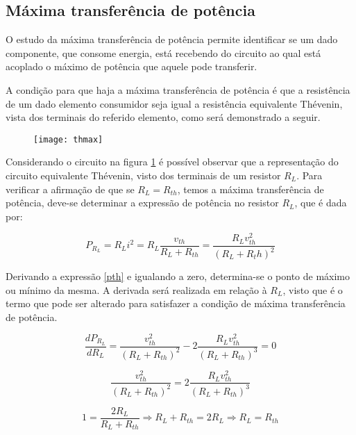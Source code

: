 \documentclass[12pt,fleqn]{book} %
\begin{document}
    \subsection{Máxima transferência de potência}{

O estudo da máxima transferência de potência permite identificar se um dado componente, que consome energia, está recebendo do circuito ao qual está acoplado o máximo de potência que aquele pode transferir.

A condição para que haja a máxima transferência de potência é que a resistência de um dado elemento consumidor seja igual a resistência equivalente Thévenin, vista dos terminais do referido elemento, como será demonstrado a seguir.

\begin{figure}[!htbp] \centering\texttt{[image: thmax]}
            \caption{}\label{thmax} 
        \end{figure}

Considerando o circuito na figura \ref{thmax} é possível observar que a representação do circuito equivalente Thévenin, visto dos terminais de um resistor $R_L$. Para verificar a afirmação de que se $R_L=R_{th}$, temos a máxima transferência de potência, deve-se determinar a expressão de potência no resistor $R_L$, que é dada por:

\begin{equation}\label{pth}
P_{R_L} = R_L i^2 = R_L \frac{v_{th}}{R_L+R_{th}} = \frac{R_L v_{th}^2}{(R_L+R_th)^2} 
\end{equation} 

Derivando a expressão \ref{pth} e igualando a zero, determina-se o ponto de máximo ou mínimo da mesma. A derivada será realizada em relação à $R_L$, visto que é o termo que pode ser alterado para satisfazer a condição de máxima transferência de potência.

\begin{equation}
\frac{dP_{R_L}}{dR_L}= \frac{v_{th}^2}{(R_L+R_{th})^2} -2\frac{R_L v_{th}^2}{(R_L+R_{th})^3} =0
\end{equation}

\begin{equation}
\frac{v_{th}^2}{(R_L+R_{th})^2} = 2\frac{R_L v_{th}^2}{(R_L+R_{th})^3}
\end{equation}

\begin{equation}
1=\frac{2R_L}{R_L+R_{th}} \Rightarrow R_L+R_{th}=2R_L \Rightarrow R_L=R_{th}
\end{equation}

}
\end{document}
